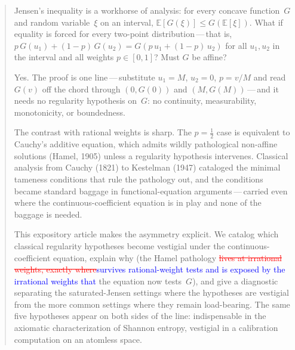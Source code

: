 \documentclass{article}
\newcommand{\ReviewAdd}[1]{\textcolor{blue}{#1}}
\newcommand{\ReviewDel}[1]{\textcolor{red}{\sout{#1}}}
\theoremstyle{plain}
\theoremstyle{definition}
\newcommand{\E}{\mathbb{E}}
\begin{document}
\author{}

\maketitle

\begin{abstract}
Jensen's inequality is a workhorse of analysis: for every concave
function~$G$ and random variable~$\xi$ on an interval,
$\E[G(\xi)]\le G(\E[\xi])$. What if equality is forced for every
two-point distribution\,---\,that is,
$p\,G(u_1)+(1-p)\,G(u_2)=G(p\,u_1+(1-p)\,u_2)$ for all $u_1,u_2$ in
the interval and all weights $p\in[0,1]$? Must $G$ be affine?

Yes. The proof is one line\,---\,substitute $u_1=M$, $u_2=0$, $p=v/M$
and read $G(v)$ off the chord through $(0,G(0))$ and
$(M,G(M))$\,---\,and it needs no regularity hypothesis on~$G$: no
continuity, measurability, monotonicity, or boundedness.

The contrast with rational weights is sharp. The $p=\tfrac12$ case is
equivalent to Cauchy's additive equation, which admits wildly
pathological non-affine solutions (Hamel, 1905) unless a regularity
hypothesis intervenes. Classical analysis from Cauchy (1821) to
Kestelman (1947) cataloged the minimal tameness conditions that rule
the pathology out, and the conditions became standard baggage in
functional-equation arguments\,---\,carried even where the
continuous-coefficient equation is in play and none of the baggage is
needed.

This expository article makes the asymmetry explicit. We catalog which
classical regularity hypotheses become vestigial under the
continuous-coefficient equation, explain why (the Hamel pathology
\ReviewDel{lives at irrational weights, exactly where}\ReviewAdd{survives rational-weight tests and is exposed by the irrational weights that} the equation now
tests~$G$), and give a diagnostic separating the saturated-Jensen
settings where the hypotheses are vestigial from the more common
settings where they remain load-bearing. The same five hypotheses
appear on both sides of the line: indispensable in the axiomatic
characterization of Shannon entropy, vestigial in a calibration
computation on an atomless space.
\end{abstract}
\end{document}
